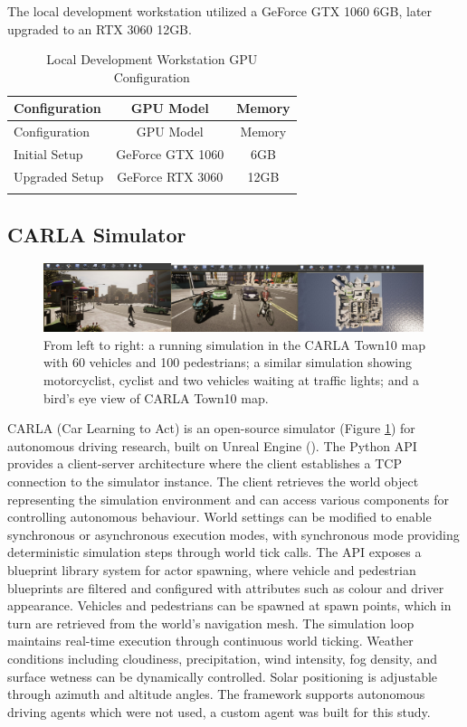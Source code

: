 The local development workstation utilized a GeForce GTX 1060 6GB, later upgraded to an RTX 3060 12GB.

\begin{longtable}{@{}lcc@{}}
\toprule
Configuration & GPU Model & Memory \\
\midrule
\endfirsthead
\toprule
Configuration & GPU Model & Memory \\
\midrule
\endhead
Initial Setup & GeForce GTX 1060 & 6GB \\
Upgraded Setup & GeForce RTX 3060 & 12GB \\
\bottomrule
\caption{Local Development Workstation GPU Configuration}
\label{tab:local_hardware}
\end{longtable}

\subsection{CARLA Simulator}
\label{methods:carla}

\begin{figure}[h]
\centering
\includegraphics[width=0.99\textwidth]{Figures/Methods/CarlaTown10.png}
\caption{From left to right: a running simulation in the CARLA Town10 map with 60 vehicles and 100 pedestrians; a similar simulation showing motorcyclist, cyclist and two vehicles waiting at traffic lights; and a bird's eye view of CARLA Town10 map.}
\label{fig:CarlaTown10}
\end{figure}

CARLA (Car Learning to Act) is an open-source simulator (Figure \ref{fig:CarlaTown10}) for autonomous driving research, built on Unreal Engine (\cite{unrealengine}). The Python API provides a client-server architecture where the client establishes a TCP connection to the simulator instance. The client retrieves the world object representing the simulation environment and can access various components for controlling autonomous behaviour. World settings can be modified to enable synchronous or asynchronous execution modes, with synchronous mode providing deterministic simulation steps through world tick calls. The API exposes a blueprint library system for actor spawning, where vehicle and pedestrian blueprints are filtered and configured with attributes such as colour and driver appearance. Vehicles and pedestrians can be spawned at spawn points, which in turn are retrieved from the world's navigation mesh. The simulation loop maintains real-time execution through continuous world ticking. Weather conditions including cloudiness, precipitation, wind intensity, fog density, and surface wetness can be dynamically controlled. Solar positioning is adjustable through azimuth and altitude angles. The framework supports autonomous driving agents which were not used, a custom agent was built for this study.

